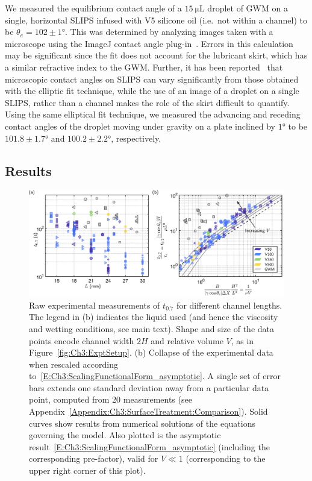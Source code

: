 \begin{subappendices}
We measured the equilibrium contact angle of a $15~\si{\micro} \si{\L}$ droplet of GWM on a single, horizontal SLIPS infused with V5 silicone oil (i.e.~not within a channel) to be $\theta_e = 102\pm 1\si{\degree}$. This was determined by analyzing images taken with a microscope using the ImageJ contact angle plug-in~\citep{Schneider2012}. Errors in this calculation may be significant since the fit does not account for the lubricant skirt, which has a similar refractive index to the GWM. Further, it has been reported~\citep{Schellenberger2015SoftMatter} that microscopic contact angles on SLIPS can vary significantly from those obtained with the elliptic fit technique, while the use of an image of a droplet on a single SLIPS, rather than a channel makes the role of the skirt difficult to quantify. Using the same elliptical fit technique, we measured the advancing and receding contact angles of the droplet moving under gravity on a plate inclined by $1\si{\degree}$ to be $101.8\pm1.7\si{\degree}$ and $100.2\pm2.2\si{\degree}$, respectively.

\subsection{Results}
\begin{figure}[t]
\centering
\includegraphics[width = \textwidth]{tpt7_both_with_NW}
\caption{ Raw experimental measurements of $t_{0.7}$ for different channel lengths. The legend in (b) indicates the liquid used (and hence the viscosity and wetting conditions, see main text). Shape and size of the data points encode channel width $2H$ and relative volume $V$, as in Figure~\ref{fig:Ch3:ExptSetup}. (b) Collapse of the experimental data when rescaled according to~\eqref{E:Ch3:ScalingFunctionalForm_asymptotic}. A single set of error bars extends one standard deviation away from a particular data point, computed from 20 measurements (see Appendix~\ref{Appendix:Ch3:SurfaceTreatment:Comparison}). Solid curves show results from numerical solutions of the equations governing the model. Also plotted is the asymptotic result~\eqref{E:Ch3:ScalingFunctionalForm_asymptotic} (including the corresponding pre-factor), valid for $V \ll 1$ (corresponding to the upper right corner of this plot).}\label{fig:Ch3:Appendix:tpt7_withNW}
\end{figure}


\end{subappendices}
